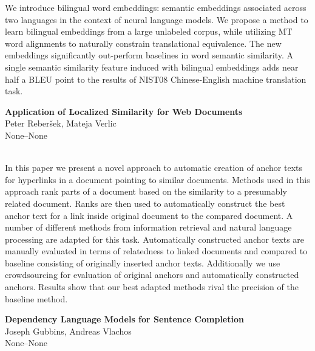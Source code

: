 \documentclass[twoside,makeidx]{book}
\renewcommand{\normalsize}{\fontsize{8}{9}\selectfont}
\renewcommand{\small}{\fontsize{7}{8}\selectfont}
\begin{document}
\nopagebreak%
\noindent%
{\small We introduce bilingual word embeddings: semantic embeddings associated across two languages in the context of neural language models. We propose a method to learn bilingual embeddings from a large unlabeled corpus, while utilizing MT word alignments to naturally constrain translational equivalence. The new embeddings significantly out-perform baselines in word semantic similarity. A single semantic similarity feature induced with bilingual embeddings adds near half a BLEU point to the results of NIST08 Chinese-English machine translation task.}
\par\vspace{2em}\noindent%
\begin{minipage}{\linewidth}%
\begin{center}
\textbf{\normalsize Application of Localized Similarity for Web Documents}\\
\normalsize  Peter Reber\v{s}ek,  Mateja Verlic\\
{\small None--None}\\
\end{center}
\end{minipage}\\[0.5em]
\nopagebreak%
\noindent%
{\small In this paper we present a novel approach to automatic creation of anchor texts for hyperlinks in a document pointing to similar documents. Methods used in this approach rank parts of a document based on the similarity to a presumably related document. Ranks are then used to automatically construct the best anchor text for a link inside original document to the compared document. A number of different methods from information retrieval and natural language processing are adapted for this task. Automatically constructed anchor texts are manually evaluated in terms of relatedness to linked documents and compared to baseline consisting of originally inserted anchor texts. Additionally we use crowdsourcing for evaluation of original anchors and automatically constructed anchors. Results show that our best adapted methods rival the precision of the baseline method.}
\par\vspace{2em}\noindent%
\begin{minipage}{\linewidth}%
\begin{center}
\textbf{\normalsize Dependency Language Models for Sentence Completion}\\
\normalsize  Joseph Gubbins,  Andreas Vlachos\\
{\small None--None}\\
\end{center}
\end{minipage}\\[0.5em]
\end{document}
